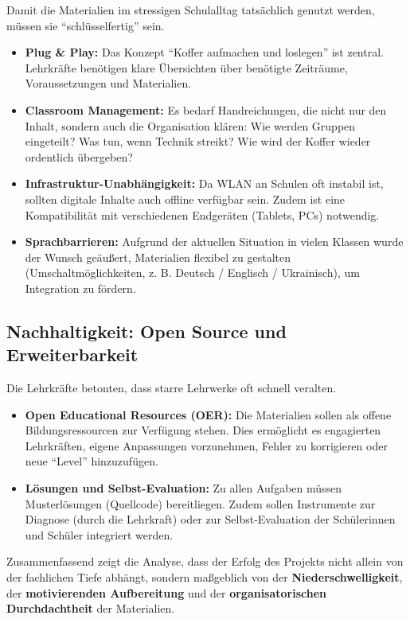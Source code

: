 \documentclass[a5paper,pagesize,10pt,bibtotoc,pointlessnumbers,
normalheadings,DIV=9,twoside=false]{scrbook}
\begin{document}
Damit die Materialien im stressigen Schulalltag tatsächlich genutzt werden, müssen sie ``schlüsselfertig'' sein.

\begin{itemize}
    \item \textbf{Plug \& Play:} Das Konzept ``Koffer aufmachen und loslegen'' ist zentral. Lehrkräfte benötigen klare Übersichten über benötigte Zeiträume, Voraussetzungen und Materialien.
    \item \textbf{Classroom Management:} Es bedarf Handreichungen, die nicht nur den Inhalt, sondern auch die Organisation klären: Wie werden Gruppen eingeteilt? Was tun, wenn Technik streikt? Wie wird der Koffer wieder ordentlich übergeben?
    \item \textbf{Infrastruktur-Unabhängigkeit:} Da WLAN an Schulen oft instabil ist, sollten digitale Inhalte auch offline verfügbar sein. Zudem ist eine Kompatibilität mit verschiedenen Endgeräten (Tablets, PCs) notwendig.
    \item \textbf{Sprachbarrieren:} Aufgrund der aktuellen Situation in vielen Klassen wurde der Wunsch geäußert, Materialien flexibel zu gestalten (Umschaltmöglichkeiten, z. B. Deutsch / Englisch / Ukrainisch), um Integration zu fördern.
\end{itemize}

\subsection*{Nachhaltigkeit: Open Source und Erweiterbarkeit}

Die Lehrkräfte betonten, dass starre Lehrwerke oft schnell veralten.

\begin{itemize}
    \item \textbf{Open Educational Resources (OER):} Die Materialien sollen als offene Bildungsressourcen zur Verfügung stehen. Dies ermöglicht es engagierten Lehrkräften, eigene Anpassungen vorzunehmen, Fehler zu korrigieren oder neue ``Level'' hinzuzufügen.
    \item \textbf{Lösungen und Selbst-Evaluation:} Zu allen Aufgaben müssen Musterlösungen (Quellcode) bereitliegen. Zudem sollen Instrumente zur Diagnose (durch die Lehrkraft) oder zur Selbst-Evaluation der Schülerinnen und Schüler integriert werden.
\end{itemize}

Zusammenfassend zeigt die Analyse, dass der Erfolg des Projekts nicht allein von der fachlichen Tiefe abhängt, sondern maßgeblich von der \textbf{Niederschwelligkeit}, der \textbf{motivierenden Aufbereitung} und der \textbf{organisatorischen Durchdachtheit} der Materialien.
\end{document}
